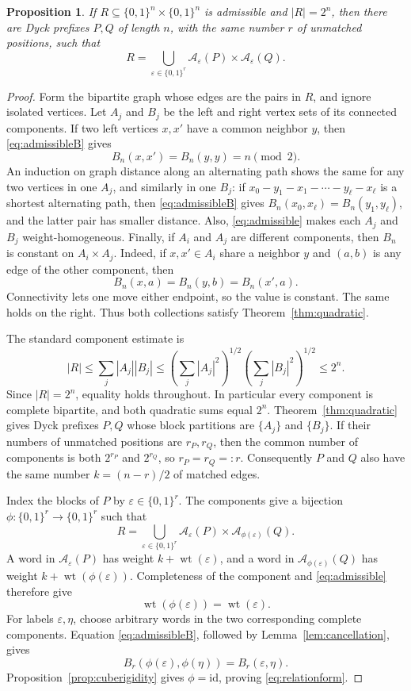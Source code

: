 \documentclass[11pt]{article}
\newtheorem{proposition}[theorem]{Proposition}
\theoremstyle{definition}
\newcommand{\wt}{\operatorname{wt}}
\newcommand{\A}{\mathcal A}
\newcommand{\bits}{\{0,1\}}
\newcommand{\eps}{\varepsilon}
\begin{document}
\begin{proposition}\label{prop:relation}
If $R\subseteq\bits^n\times\bits^n$ is admissible and $|R|=2^n$, then there are Dyck prefixes $P,Q$ of length $n$, with the same number $r$ of unmatched positions, such that
\begin{equation}\label{eq:relationform}
 R=\bigcup_{\eps\in\bits^r}
 \A_{\eps}(P)\times\A_{\eps}(Q).
\end{equation}
\end{proposition}

\begin{proof}
Form the bipartite graph whose edges are the pairs in $R$, and ignore isolated vertices.  Let $A_j$ and $B_j$ be the left and right vertex sets of its connected components.  If two left vertices $x,x'$ have a common neighbor $y$, then \eqref{eq:admissibleB} gives
\[
 B_n(x,x')=B_n(y,y)=n\pmod2.
\]
An induction on graph distance along an alternating path shows the same for any two vertices in one $A_j$, and similarly in one $B_j$: if $x_0-y_1-x_1-\cdots-y_\ell-x_\ell$ is a shortest alternating path, then \eqref{eq:admissibleB} gives $B_n(x_0,x_\ell)=B_n(y_1,y_\ell)$, and the latter pair has smaller distance.  Also, \eqref{eq:admissible} makes each $A_j$ and $B_j$ weight-homogeneous.  Finally, if $A_i$ and $A_j$ are different components, then $B_n$ is constant on $A_i\times A_j$.  Indeed, if $x,x'\in A_i$ share a neighbor $y$ and $(a,b)$ is any edge of the other component, then
\[
 B_n(x,a)=B_n(y,b)=B_n(x',a).
\]
Connectivity lets one move either endpoint, so the value is constant.  The same holds on the right.  Thus both collections satisfy Theorem~\ref{thm:quadratic}.

The standard component estimate is
\begin{equation}\label{eq:componentchain}
 |R|
 \le \sum_j|A_j||B_j|
 \le\left(\sum_j|A_j|^2\right)^{1/2}
      \left(\sum_j|B_j|^2\right)^{1/2}
 \le2^n.
\end{equation}
Since $|R|=2^n$, equality holds throughout.  In particular every component is complete bipartite, and both quadratic sums equal $2^n$.  Theorem~\ref{thm:quadratic} gives Dyck prefixes $P,Q$ whose block partitions are $\{A_j\}$ and $\{B_j\}$.  If their numbers of unmatched positions are $r_P,r_Q$, then the common number of components is both $2^{r_P}$ and $2^{r_Q}$, so $r_P=r_Q=:r$.  Consequently $P$ and $Q$ also have the same number $k=(n-r)/2$ of matched edges.

Index the blocks of $P$ by $\eps\in\bits^r$.  The components give a bijection $\phi:\bits^r\to\bits^r$ such that
\[
 R=\bigcup_{\eps\in\bits^r}
 \A_{\eps}(P)\times\A_{\phi(\eps)}(Q).
\]
A word in $\A_{\eps}(P)$ has weight $k+\wt(\eps)$, and a word in $\A_{\phi(\eps)}(Q)$ has weight $k+\wt(\phi(\eps))$.  Completeness of the component and \eqref{eq:admissible} therefore give
\[
 \wt(\phi(\eps))=\wt(\eps).
\]
For labels $\eps,\eta$, choose arbitrary words in the two corresponding complete components.  Equation \eqref{eq:admissibleB}, followed by Lemma~\ref{lem:cancellation}, gives
\[
 B_r(\phi(\eps),\phi(\eta))=B_r(\eps,\eta).
\]
Proposition~\ref{prop:cuberigidity} gives $\phi=\mathrm{id}$, proving \eqref{eq:relationform}.
\end{proof}
\end{document}
